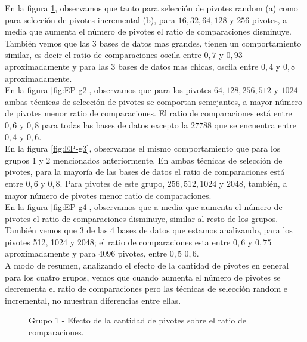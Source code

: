 En la figura \ref{fig:EP-g1}, observamos que tanto para selecci\'on de pivotes random (a) como para selecci\'on de pivotes incremental (b), para $16, 32, 64, 128$ y $256$ pivotes, a media que aumenta el n\'umero de pivotes el ratio de comparaciones disminuye. Tambi\'en vemos que las 3 bases de datos mas grandes, tienen un comportamiento similar, es decir el ratio de comparaciones oscila entre $0,7$ y $0,93$ aproximadamente y para las 3 bases de datos mas chicas, oscila entre $0,4$ y $0,8$ aproximadamente.\\

En la figura \ref{fig:EP-g2}, observamos que para los pivotes $64, 128, 256, 512$ y $1024$ ambas t\'ecnicas de selecci\'on de pivotes se comportan semejantes, a mayor n\'umero de pivotes menor ratio de comparaciones. El ratio de comparaciones est\'a entre $0,6$ y $0,8$ para todas las bases de datos excepto la $27788$ que se encuentra entre $0,4$ y $0,6$.\\

En la figura \ref{fig:EP-g3}, observamos el mismo comportamiento que para los grupos 1 y 2 mencionados anteriormente. En ambas t\'ecnicas de selecci\'on de pivotes, para la mayor\'ia de las bases de datos el ratio de comparaciones est\'a entre $0,6$ y $0,8$. Para pivotes de este grupo, $256, 512, 1024$ y $2048$, tambi\'en, a mayor n\'umero de pivotes menor ratio de comparaciones.\\

En la figura \ref{fig:EP-g4}, observamos que a media que aumenta el n\'umero de pivotes el ratio de comparaciones disminuye, similar al resto de los grupos. Tambi\'en vemos que 3 de las 4 bases de datos que estamos analizando, para los pivotes 512, 1024 y 2048; el ratio de comparaciones esta entre $0,6$ y $0,75$ aproximadamente y para 4096 pivotes, entre $0,5$ $0,6$.\\

A modo de resumen, analizando el efecto de la cantidad de pivotes en general para los cuatro grupos, vemos que cuando aumenta el n\'umero de pivotes se decrementa el ratio de comparaciones pero las t\'ecnicas de selecci\'on random e incremental, no muestran diferencias entre ellas.

\begin{figure}[tb]
\centering
{}
		\caption{\small Grupo 1 - Efecto de la cantidad de pivotes sobre el ratio de comparaciones.}
		\label{fig:EP-g1}
\end{figure}

